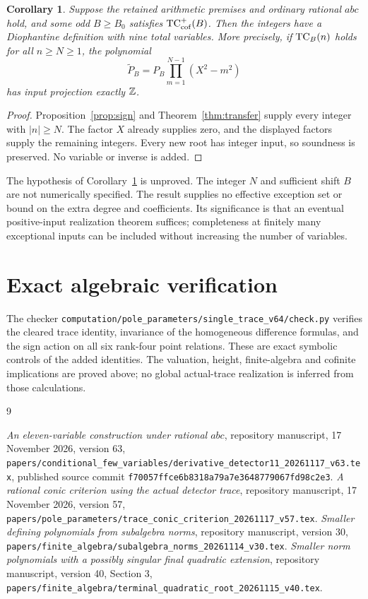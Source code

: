 \documentclass[11pt,a4paper]{article}
\newtheorem{corollary}[theorem]{Corollary}
\begin{document}
\begin{corollary}\label{cor:cofinite}
Suppose the retained arithmetic premises and ordinary rational $abc$
hold, and some odd $B\ge B_0$ satisfies
$\operatorname{TC}^+_{\mathrm{cof}}(B)$. Then the integers have a Diophantine
definition with nine total variables. More precisely, if
$\operatorname{TC}_B(n)$ holds for all $n\ge N\ge1$, the polynomial
\[
              \widetilde P_B
                =P_B\prod_{m=1}^{N-1}(X^2-m^2)
\]
has input projection exactly $\mathbb Z$.
\end{corollary}
\begin{proof}
Proposition~\ref{prop:sign} and Theorem~\ref{thm:transfer} supply
every integer with $|n|\ge N$. The factor $X$ already supplies
zero, and the displayed factors supply the remaining integers.
Every new root has integer input, so soundness is preserved.
No variable or inverse is added.
\end{proof}

The hypothesis of Corollary~\ref{cor:cofinite} is unproved. The
integer $N$ and sufficient shift $B$ are not numerically specified.
The result supplies no effective exception set or bound on the
extra degree and coefficients. Its significance is that an eventual
positive-input realization theorem suffices; completeness at finitely
many exceptional inputs can be included without increasing the
number of variables.

\section{Exact algebraic verification}

\begingroup\raggedright
The checker
\nolinkurl{computation/pole_parameters/single_trace_v64/check.py}
verifies the cleared trace identity, invariance of the homogeneous
difference formulas, and the sign action on all six rank-four point
relations. These are exact symbolic controls of the added identities.
The valuation, height, finite-algebra and cofinite implications are
proved above; no global actual-trace realization is inferred from
those calculations.\par\endgroup

\begin{thebibliography}{9}\raggedright
{}\emph{An eleven-variable construction under rational
$abc$}, repository manuscript, 17 November 2026, version 63,
\nolinkurl{papers/conditional_few_variables/derivative_detector11_20261117_v63.tex},
published source commit
\nolinkurl{f70057ffce6b8318a79a7e3648779067fd98c2e3}.
\emph{A rational conic criterion using the actual detector
trace}, repository manuscript, 17 November 2026, version 57,
\nolinkurl{papers/pole_parameters/trace_conic_criterion_20261117_v57.tex}.
\emph{Smaller defining polynomials from subalgebra
norms}, repository manuscript, version 30,
\nolinkurl{papers/finite_algebra/subalgebra_norms_20261114_v30.tex}.
\emph{Smaller norm polynomials with a possibly singular
final quadratic extension}, repository manuscript, version 40,
Section 3,
\nolinkurl{papers/finite_algebra/terminal_quadratic_root_20261115_v40.tex}.
\end{thebibliography}
\end{document}
